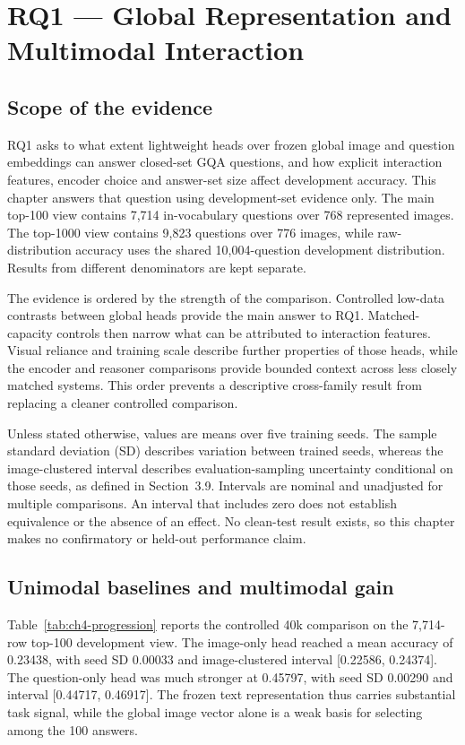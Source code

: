 \chapter{RQ1 — Global Representation and Multimodal Interaction}
\sloppy

\section{Scope of the evidence}
\label{sec:ch4-scope}
RQ1 asks to what extent lightweight heads over frozen global image and question
embeddings can answer closed-set GQA questions, and how explicit interaction
features, encoder choice and answer-set size affect development accuracy. This
chapter answers that question using development-set evidence only. The main
top-100 view contains 7,714 in-vocabulary questions over 768 represented
images. The top-1000 view contains 9,823 questions over 776 images, while
raw-distribution accuracy uses the shared 10,004-question development
distribution. Results from different denominators are kept separate.

The evidence is ordered by the strength of the comparison. Controlled
low-data contrasts between global heads provide the main answer to RQ1.
Matched-capacity controls then narrow what can be attributed to interaction
features. Visual reliance and training scale describe further properties of
those heads, while the encoder and reasoner comparisons provide bounded
context across less closely matched systems. This order prevents a descriptive
cross-family result from replacing a cleaner controlled comparison.

Unless stated otherwise, values are means over five training seeds. The sample
standard deviation (SD) describes variation between trained seeds, whereas the
image-clustered interval describes evaluation-sampling uncertainty conditional
on those seeds, as defined in Section~3.9. Intervals are nominal and unadjusted
for multiple comparisons. An interval that includes zero does not establish
equivalence or the absence of an effect. No clean-test result exists, so this
chapter makes no confirmatory or held-out performance claim.

\section{Unimodal baselines and multimodal gain}
\label{sec:ch4-baselines}
Table~\ref{tab:ch4-progression} reports the controlled 40k comparison on the
7,714-row top-100 development view. The image-only head reached a mean accuracy
of 0.23438, with seed SD 0.00033 and image-clustered interval [0.22586,
0.24374]. The question-only head was much stronger at 0.45797, with seed SD
0.00290 and interval [0.44717, 0.46917]. The frozen text representation thus
carries substantial task signal, while the global image vector alone is a weak
basis for selecting among the 100 answers.


